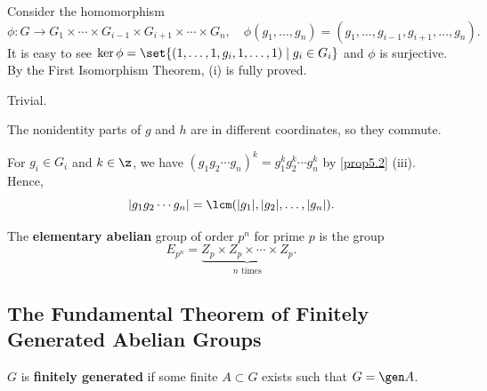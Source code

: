 \begin{proofnum}
    \item Consider the homomorphism 
    \[\phi : G \to G_1 \times \cdots \times G_{i - 1} \times G_{i + 1} \times \cdots \times G_n, \quad \phi(g_1, \ldots, g_n) = (g_1, \ldots, g_{i - 1}, g_{i + 1}, \ldots, g_n).\] 
    It is easy to see $\ker\phi = \set{(1, \ldots, 1, g_i, 1, \ldots, 1) \mid g_i \in G_i}$ and $\phi$ is surjective. By the First Isomorphism Theorem, (i) is fully proved.
    \item Trivial.
    \item The nonidentity parts of $g$ and $h$ are in different coordinates, so they commute.
\end{proofnum}

\note For $g_i \in G_i$ and $k \in \z$, we have $(g_1g_2\cdots g_n)^k = g_1^kg_2^k \cdots g_n^k$ by \autoref{prop5.2} (iii). Hence,
\[|g_1g_2\cdots g_n| = \lcm(|g_1|, |g_2|, \ldots, |g_n|).\]

 The \textbf{elementary abelian} group of order $p^n$ for prime $p$ is the group
\[E_{p^n} = \underbrace{Z_p \times Z_p \times \cdots \times Z_p}_{n \text{ times}}.\]

\subsection{The Fundamental Theorem of Finitely Generated Abelian Groups}

 $G$ is \textbf{finitely generated} if some finite $A \subset G$ exists such that $G = \gen A$.

